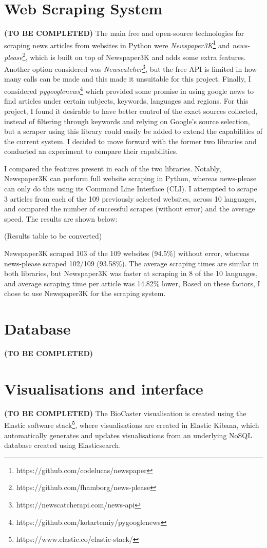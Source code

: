\documentclass{l4proj}
\begin{document}
\section{Web Scraping System}
\textbf{(TO BE COMPLETED)}
The main free and open-source technologies for scraping news articles from websites in Python were \emph{Newspaper3K}\footnote{https://github.com/codelucas/newspaper} and \emph{news-please}\footnote{https://github.com/fhamborg/news-please}, which is built on top of Newspaper3K and adds some extra features. Another option considered was \emph{Newscatcher}\footnote{https://newscatcherapi.com/news-api}, but the free API is limited in how many calls can be made and this made it unsuitable for this project. Finally, I considered \emph{pygooglenews}\footnote{https://github.com/kotartemiy/pygooglenews} which provided some promise in using google news to find articles under certain subjects, keywords, languages and regions. For this project, I found it desirable to have better control of the exact sources collected, instead of filtering through keywords and relying on Google's source selection, but a scraper using this library could easily be added to extend the capabilities of the current system. I decided to move forward with the former two libraries and conducted an experiment to compare their capabilities. \par

I compared the features present in each of the two libraries. Notably, Newspaper3K can perform full website scraping in Python, whereas news-please can only do this using its Command Line Interface (CLI). I attempted to scrape 3 articles from each of the 109 previously selected websites, across 10 languages, and compared the number of successful scrapes (without error) and the average speed. The results are shown below: \par 
(Results table to be converted) \par
Newspaper3K scraped 103 of the 109 websites (94.5\%) without error, whereas news-please scraped 102/109 (93.58\%). The average scraping times are similar in both libraries, but Newspaper3K was faster at scraping in 8 of the 10 languages, and average scraping time per article was 14.82\% lower, Based on these factors, I chose to use Newspaper3K for the scraping system.
\section{Database}
\textbf{(TO BE COMPLETED)}
\section{Visualisations and interface}
\textbf{(TO BE COMPLETED)}
The BioCaster visualisation is created using the Elastic software stack\footnote{https://www.elastic.co/elastic-stack/}, where visualisations are created in Elastic Kibana, which automatically generates and updates visualisations from an underlying NoSQL database created using Elasticsearch.
\end{document}
